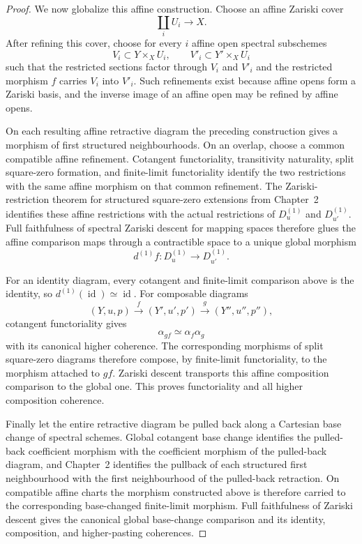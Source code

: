 \begin{proof}
We now globalize this affine construction.  Choose an affine Zariski cover
\[
    \coprod_i U_i\longrightarrow X.
\]
After refining this cover, choose for every $i$ affine open spectral
subschemes
\[
    V_i\subset Y\times_XU_i,
    \qquad
    V'_i\subset Y'\times_XU_i
\]
such that the restricted sections factor through $V_i$ and $V'_i$ and the
restricted morphism $f$ carries $V_i$ into $V'_i$.  Such refinements exist
because affine opens form a Zariski basis, and the inverse image of an affine
open may be refined by affine opens.

On each resulting affine retractive diagram the preceding construction gives
a morphism of first structured neighbourhoods.  On an overlap, choose a
common compatible affine refinement.  Cotangent functoriality, transitivity
naturality, split square-zero formation, and finite-limit functoriality
identify the two restrictions with the same affine morphism on that common
refinement.  The Zariski-restriction theorem for structured square-zero
extensions from Chapter~2 identifies these affine restrictions with the
actual restrictions of
$D^{(1)}_u$ and $D^{(1)}_{u'}$.  Full faithfulness of spectral Zariski descent
for mapping spaces therefore glues the affine comparison maps through a
contractible space to a unique global morphism
\[
    d^{(1)}f:
    D^{(1)}_u
    \longrightarrow
    D^{(1)}_{u'}.
\]

For an identity diagram, every cotangent and finite-limit comparison above is
the identity, so
$d^{(1)}(\operatorname{id})\simeq\operatorname{id}$.
For composable diagrams
\[
    (Y,u,p)\xrightarrow{f}(Y',u',p')
    \xrightarrow{g}(Y'',u'',p''),
\]
cotangent functoriality gives
\[
    \alpha_{gf}
    \simeq
    \alpha_f\alpha_g
\]
with its canonical higher coherence.  The corresponding morphisms of split
square-zero diagrams therefore compose, by finite-limit functoriality, to
the morphism attached to $gf$.  Zariski descent transports this affine
composition comparison to the global one.  This proves functoriality and all
higher composition coherence.

Finally let the entire retractive diagram be pulled back along a Cartesian
base change of spectral schemes.  Global cotangent base change identifies
the pulled-back coefficient morphism with the coefficient morphism of the
pulled-back diagram, and Chapter~2 identifies the pullback of each structured
first neighbourhood with the first neighbourhood of the pulled-back
retraction.  On compatible affine charts the morphism constructed above is
therefore carried to the corresponding base-changed finite-limit morphism.
Full faithfulness of Zariski descent gives the canonical global base-change
comparison and its identity, composition, and higher-pasting coherences.
\end{proof}

